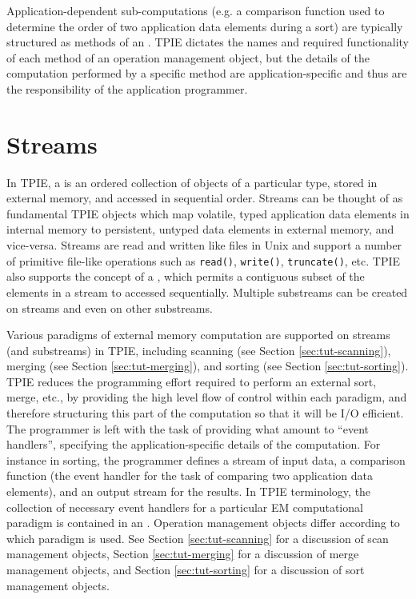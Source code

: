 Application-dependent sub-computations (e.g. a comparison
function used to determine the order of two application data
elements during a sort) are typically structured as methods
of an . TPIE dictates the
names and required functionality of each method of an
operation management object, but the details of the
computation performed by a specific method are
application-specific and thus are the responsibility of the
application programmer. 


\section{Streams}


In TPIE, a  is an ordered collection of objects
of a particular type, stored in external memory, and
accessed in sequential order. Streams can be thought of as
fundamental TPIE objects which map volatile, typed
application data elements in internal
memory to persistent, untyped data elements in external
memory, and vice-versa.  Streams are read and written like
files in Unix and support a number of primitive file-like
operations such as \lstinline|read()|, \lstinline|write()|, 
\lstinline|truncate()|, etc. 
TPIE also supports the concept of a , which
permits a contiguous subset of the elements in a stream to
accessed sequentially. Multiple substreams can be created on
streams and even on other substreams. 

Various paradigms of external memory computation are
supported on streams (and substreams) in TPIE, including
scanning (see Section \ref{sec:tut-scanning}), merging (see
Section \ref{sec:tut-merging}), and sorting (see Section
\ref{sec:tut-sorting}). TPIE reduces the programming effort
required to perform an external sort, merge, etc., by
providing the high level flow of control within each
paradigm, and therefore structuring this part of the
computation so that it will be I/O efficient. The programmer
is left with the task of providing what amount to ``event
handlers'', specifying the application-specific details of
the computation. For instance in sorting, the programmer
defines a stream of input data, a comparison function (the
event handler for the task of comparing two application data
elements), and an output stream for the results. In TPIE
terminology, the collection of necessary event handlers for
a particular EM computational paradigm is contained in an
. Operation management objects differ
according to which paradigm is used.  See Section
\ref{sec:tut-scanning} for a discussion of scan management
objects, Section \ref{sec:tut-merging} for a discussion of merge
management objects, and Section \ref{sec:tut-sorting} for a
discussion of sort management objects.

